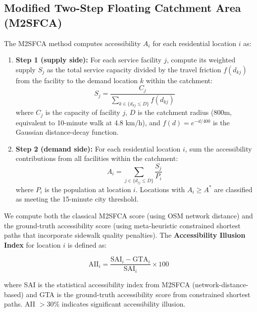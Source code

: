 \documentclass[journal]{IEEEtran}
\begin{document}
\subsection{Modified Two-Step Floating Catchment Area (M2SFCA)}
\label{sec:m2sfca}

The M2SFCA method computes accessibility $A_i$ for each residential location $i$ as:

\begin{enumerate}
    \item \textbf{Step 1 (supply side):} For each service facility $j$, compute its weighted supply $S_j$ as the total service capacity divided by the travel friction $f(d_{kj})$ from the facility to the demand location $k$ within the catchment:
    \begin{equation}
    S_j = \frac{C_j}{\sum_{k \in \{d_{kj} \leq D\}} f(d_{kj})}
    \label{eq:m2sfca_step1}
    \end{equation}
    where $C_j$ is the capacity of facility $j$, $D$ is the catchment radius (800m, equivalent to 10-minute walk at 4.8 km/h), and $f(d) = e^{-d/400}$ is the Gaussian distance-decay function.

    \item \textbf{Step 2 (demand side):} For each residential location $i$, sum the accessibility contributions from all facilities within the catchment:
    \begin{equation}
    A_i = \sum_{j \in \{d_{ij} \leq D\}} \frac{S_j}{P_i}
    \label{eq:m2sfca_step2}
    \end{equation}
    where $P_i$ is the population at location $i$. Locations with $A_i \geq A^*$ are classified as meeting the 15-minute city threshold.
\end{enumerate}

We compute both the classical M2SFCA score (using OSM network distance) and the ground-truth accessibility score (using meta-heuristic constrained shortest paths that incorporate sidewalk quality penalties). The \textbf{Accessibility Illusion Index} for location $i$ is defined as:

\begin{equation}
\text{AII}_i = \frac{\text{SAI}_i - \text{GTA}_i}{\text{SAI}_i} \times 100
\label{eq:aii}
\end{equation}

where SAI is the statistical accessibility index from M2SFCA (network-distance-based) and GTA is the ground-truth accessibility score from constrained shortest paths. AII $> 30\%$ indicates significant accessibility illusion.
\end{document}
